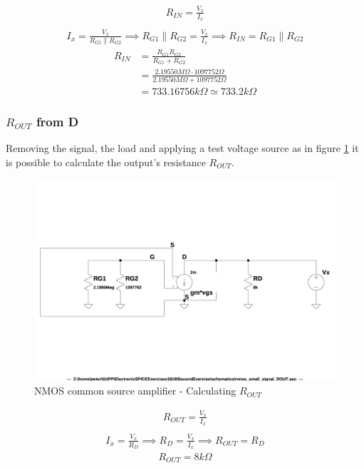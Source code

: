 \documentclass[10pt,a4paper]{book}
\begin{document}
\begin{align}
R_{IN} = \frac{V_x}{I_x}\\
\end{align}
\begin{align}
I_x = \frac{V_x}{R_{G1} \parallel R_{G2}} \implies R_{G1} \parallel R_{G2} = \frac{V_x}{I_x}
\implies R_{IN} = R_{G1} \parallel R_{G2}
\end{align}
\begin{align}
R_{IN} &= \frac{R_{G1} R_{G2}}{R_{G1} + R_{G2}}\\
&= \frac{2.19550 M\Omega \cdot 1097752\Omega}{2.19550 M\Omega + 1097752\Omega}\\
&= 733.16756k\Omega \simeq 733.2k\Omega
\end{align}

\subsubsection{$R_{OUT}$ from D}\label{ROUT}

Removing the signal, the load and applying a test voltage source as in figure \ref{nmos_pi_ROUT} it is possible to calculate the output's resistance $R_{OUT}$.\\

\begin{figure}[h]
  \centering
  \includegraphics[width=12cm]{schematics/nmos_small_signal_ROUT.jpg}
  \caption{NMOS common source amplifier - Calculating $R_{OUT}$}
  \label{nmos_pi_ROUT}
\end{figure}

\begin{align}
R_{OUT} = \frac{V_x}{I_x}\\
\end{align}
\begin{align}
I_x = \frac{V_x}{R_D} \implies R_D = \frac{V_x}{I_x} \implies R_{OUT} = R_D 
\end{align}
\begin{align}
R_{OUT} = 8k\Omega
\end{align}
\end{document}
